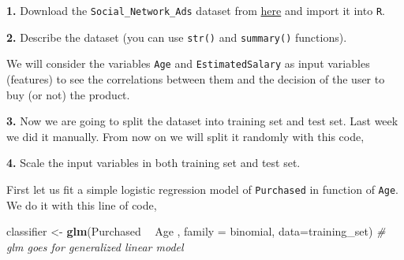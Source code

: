 \documentclass[]{book}
\newenvironment{Shaded}{\begin{snugshade}}{\end{snugshade}}
\newcommand{\KeywordTok}[1]{\textcolor[rgb]{0.13,0.29,0.53}{\textbf{#1}}}
\newcommand{\DataTypeTok}[1]{\textcolor[rgb]{0.13,0.29,0.53}{#1}}
\newcommand{\DecValTok}[1]{\textcolor[rgb]{0.00,0.00,0.81}{#1}}
\newcommand{\FloatTok}[1]{\textcolor[rgb]{0.00,0.00,0.81}{#1}}
\newcommand{\StringTok}[1]{\textcolor[rgb]{0.31,0.60,0.02}{#1}}
\newcommand{\CommentTok}[1]{\textcolor[rgb]{0.56,0.35,0.01}{\textit{#1}}}
\newcommand{\OtherTok}[1]{\textcolor[rgb]{0.56,0.35,0.01}{#1}}
\newcommand{\OperatorTok}[1]{\textcolor[rgb]{0.81,0.36,0.00}{\textbf{#1}}}
\newcommand{\NormalTok}[1]{#1}
\begin{document}
\textbf{1.} Download the \texttt{Social\_Network\_Ads} dataset from
\href{datasets/Social_Network_Ads.csv}{here} and import it into
\texttt{R}.

\textbf{2.} Describe the dataset (you can use \texttt{str()} and
\texttt{summary()} functions).

We will consider the variables \texttt{Age} and \texttt{EstimatedSalary}
as input variables (features) to see the correlations between them and
the decision of the user to buy (or not) the product.

\textbf{3.} Now we are going to split the dataset into training set and
test set. Last week we did it manually. From now on we will split it
randomly with this code,

\begin{Shaded}
\end{Shaded}

\textbf{4.} Scale the input variables in both training set and test set.

First let us fit a simple logistic regression model of
\texttt{Purchased} in function of \texttt{Age}. We do it with this line
of code,

\begin{Shaded}
\begin{Highlighting}[]
\NormalTok{classifier <-}\StringTok{ }\KeywordTok{glm}\NormalTok{(Purchased }\OperatorTok{~}\StringTok{ }\NormalTok{Age , }\DataTypeTok{family =}\NormalTok{ binomial, }\DataTypeTok{data=}\NormalTok{training_set)}
\CommentTok{# glm goes for generalized linear model}
\end{Highlighting}
\end{Shaded}
\end{document}
